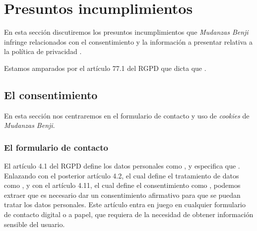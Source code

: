 \section{Presuntos incumplimientos}
En esta sección discutiremos los presuntos incumplimientos que \textit{Mudanzas Benji} infringe relacionados con el consentimiento y la información a presentar relativa a la política de privacidad .

Estamos amparados por el artículo 77.1 del RGPD que dicta que .


\subsection{El consentimiento}
En esta sección nos centraremos en el formulario de contacto y uso de \textit{cookies} de \textit{Mudanzas Benji}.

\newpage
\subsubsection{El formulario de contacto}
El artículo 4.1 del RGPD define los datos personales como , y especifica que . Enlazando con el posterior artículo 4.2, el cual define el tratamiento de datos como , y con el artículo 4.11, el cual define el consentimiento como , podemos extraer que es necesario dar un consentimiento afirmativo para que se puedan tratar los datos personales. Este artículo entra en juego en cualquier formulario de contacto digital o a papel, que requiera de la necesidad de obtener información sensible del usuario.

